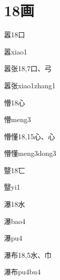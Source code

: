 
\section*{18画}

\begin{Entry}{嚣}{18}{⼝}
  \begin{Phonetics}{嚣}{xiao1}
  \end{Phonetics}
\end{Entry}

\begin{Entry}{嚣张}{18,7}{⼝、⼸}
  \begin{Phonetics}{嚣张}{xiao1zhang1}
  \end{Phonetics}
\end{Entry}

\begin{Entry}{懵}{18}{⼼}
  \begin{Phonetics}{懵}{meng3}
  \end{Phonetics}
\end{Entry}

\begin{Entry}{懵懂}{18,15}{⼼、⼼}
  \begin{Phonetics}{懵懂}{meng3dong3}
  \end{Phonetics}
\end{Entry}

\begin{Entry}{毉}{18}{⼖}
  \begin{Phonetics}{毉}{yi1}
  \end{Phonetics}
\end{Entry}

\begin{Entry}{瀑}{18}{⽔}
  \begin{Phonetics}{瀑}{bao4}
  \end{Phonetics}
  \begin{Phonetics}{瀑}{pu4}
  \end{Phonetics}
\end{Entry}

\begin{Entry}{瀑布}{18,5}{⽔、⼱}
  \begin{Phonetics}{瀑布}{pu4bu4}
  \end{Phonetics}
\end{Entry}

